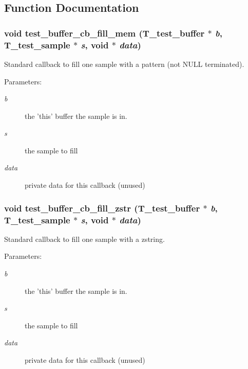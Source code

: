 \subsection{Function Documentation}
\subsubsection{\setlength{\rightskip}{0pt plus 5cm}void test\_\-buffer\_\-cb\_\-fill\_\-mem ({\bf T\_\-test\_\-buffer} $\ast$ {\em b}, {\bf T\_\-test\_\-sample} $\ast$ {\em s}, void $\ast$ {\em data})}\label{group__test__buffer_a5}


Standard callback to fill one sample with a pattern (not NULL terminated).

\begin{Desc}
\item[Parameters: ]\par
\begin{description}
\item[{\em 
b}]the 'this' buffer the sample is in. \item[{\em 
s}]the sample to fill \item[{\em 
data}]private data for this callback (unused) \end{description}
\end{Desc}
\subsubsection{\setlength{\rightskip}{0pt plus 5cm}void test\_\-buffer\_\-cb\_\-fill\_\-zstr ({\bf T\_\-test\_\-buffer} $\ast$ {\em b}, {\bf T\_\-test\_\-sample} $\ast$ {\em s}, void $\ast$ {\em data})}\label{group__test__buffer_a4}


Standard callback to fill one sample with a zstring.

\begin{Desc}
\item[Parameters: ]\par
\begin{description}
\item[{\em 
b}]the 'this' buffer the sample is in. \item[{\em 
s}]the sample to fill \item[{\em 
data}]private data for this callback (unused) \end{description}
\end{Desc}
